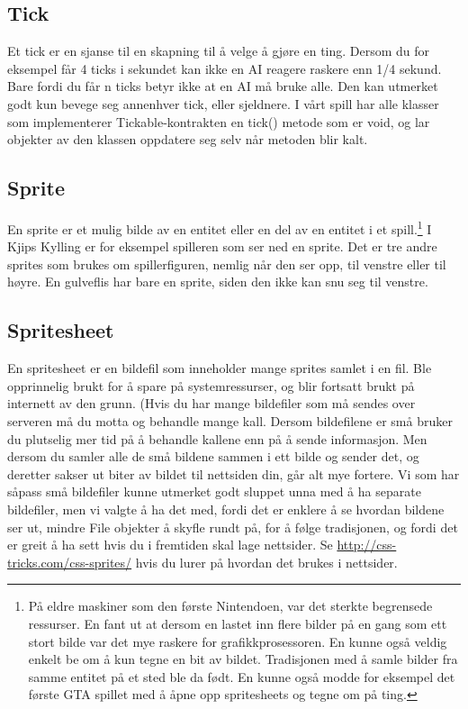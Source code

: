 \documentclass[norsk]{article}
\begin{document}
\subsection{Tick}
\label{subsec:tick}
Et tick er en sjanse til en skapning til å velge å gjøre en ting.
Dersom du for eksempel får 4 ticks i sekundet kan ikke en AI reagere raskere enn 1/4 sekund.
Bare fordi du får n ticks betyr ikke at en AI må bruke alle. Den kan utmerket godt kun bevege seg annenhver tick, eller sjeldnere.
I vårt spill har alle klasser som implementerer Tickable-kontrakten en tick() metode som er void, og lar objekter av den klassen oppdatere seg selv når metoden blir kalt.

\subsection{Sprite}
\label{subsec:sprite}
En sprite er et mulig bilde av en entitet eller en del av en entitet i et spill.\footnote{På eldre maskiner som den første Nintendoen, var det sterkte begrensede ressurser. En fant ut at dersom en lastet inn flere bilder på en gang som ett stort bilde var det mye raskere for grafikkprosessoren. En kunne også veldig enkelt be om å kun tegne en bit av bildet. Tradisjonen med å samle bilder fra samme entitet på et sted ble da født. En kunne også modde for eksempel det første GTA spillet med å åpne opp spritesheets og tegne om på ting.}
I Kjips Kylling er for eksempel spilleren som ser ned en sprite. Det er tre andre sprites som brukes om spillerfiguren, nemlig når den ser opp, til venstre eller til høyre.
En gulveflis har bare en sprite, siden den ikke kan snu seg til venstre.
\subsection{Spritesheet}
\label{subsec:spritesheet}
En spritesheet er en bildefil som inneholder mange sprites samlet i en fil. Ble opprinnelig brukt for å spare på systemressurser, og blir fortsatt brukt på internett av den grunn.
(Hvis du har mange bildefiler som må sendes over serveren må du motta og behandle mange kall. Dersom bildefilene er små bruker du plutselig mer tid på å behandle kallene enn på å sende informasjon.
Men dersom du samler alle de små bildene sammen i ett bilde og sender det, og deretter sakser ut biter av bildet til nettsiden din, går alt mye fortere.
Vi som har såpass små bildefiler kunne utmerket godt sluppet unna med å ha separate bildefiler, men vi valgte å ha det med, fordi det er enklere å se hvordan bildene ser ut, mindre File objekter å skyfle rundt på, for å følge tradisjonen, og fordi det er greit å ha sett hvis du i fremtiden skal lage nettsider.
Se \url{http://css-tricks.com/css-sprites/} hvis du lurer på hvordan det brukes i nettsider.
\end{document}

